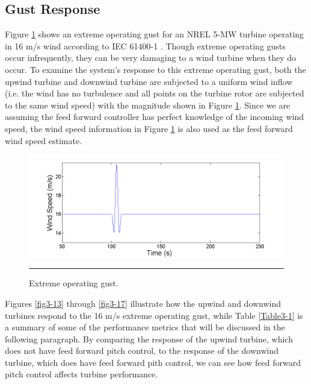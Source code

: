 \subsection{Gust Response}\label{section3-4-1}

Figure \ref{fig3-12} shows an extreme operating gust for an NREL 5-MW turbine operating in 16 m/s wind according to IEC 61400-1 \cite{IEC2005}. Though extreme operating gusts occur infrequently, they can be very damaging to a wind turbine when they do occur. To examine the system's response to this extreme operating gust, both the upwind turbine and downwind turbine are subjected to a uniform wind inflow (i.e. the wind has no turbulence and all points on the turbine rotor are subjected to the same wind speed) with the magnitude shown in Figure \ref{fig3-12}. Since we are assuming the feed forward controller has perfect knowledge of the incoming wind speed, the wind speed information in Figure \ref{fig3-12} is also used as the feed forward wind speed estimate.


\begin{figure}[htbp]
	\centering
		\includegraphics[trim = {1cm 0 2cm 0}, clip, width = \linewidth]{Figures/ch3Figures/fig3-12.png}
		\rule{35em}{0.5pt}
	\caption{Extreme operating gust.}
	\label{fig3-12}
\end{figure}


Figures \ref{fig3-13} through \ref{fig3-17} illustrate how the upwind and downwind turbines respond to the 16 m/s extreme operating gust, while Table \ref{Table3-1} is a summary of some of the performance metrics that will be discussed in the following paragraph. By comparing the response of the upwind turbine, which does not have feed forward pitch control, to the response of the downwind turbine, which does have feed forward pith control, we can see how feed forward pitch control affects turbine performance.

